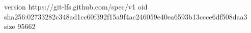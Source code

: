 version https://git-lfs.github.com/spec/v1
oid sha256:02733282c348ad1cc60f392f15a9f4ac246059e40ea6593b13ccce6df508daa3
size 95662
